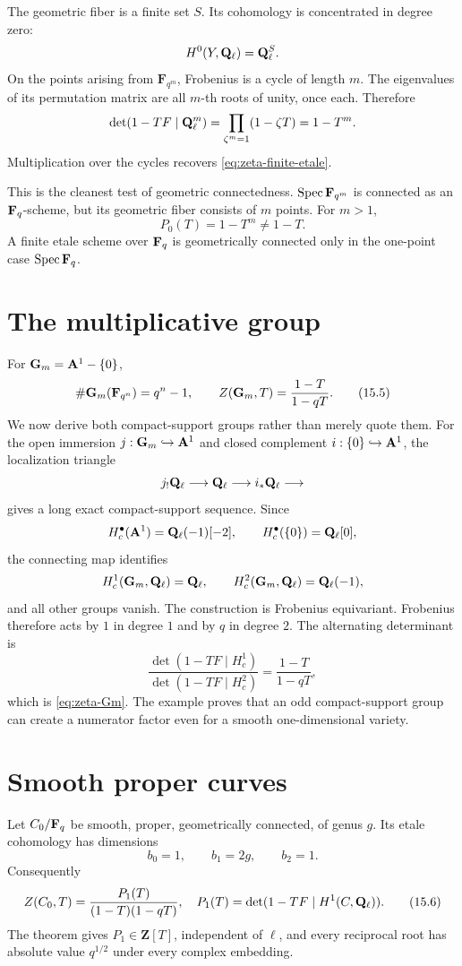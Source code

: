 The geometric fiber is a finite set \(S\).  Its cohomology is concentrated
in degree zero:
\[
 H^0(Y,\mathbf Q_\ell)=\mathbf Q_\ell^S.
\]
On the points arising from \(\mathbf F_{q^m}\), Frobenius is a cycle of
length \(m\).  The eigenvalues of its permutation matrix are all
\(m\)-th roots of unity, once each.  Therefore
\[
 \det(1-TF\mid\mathbf Q_\ell^{m})
 =\prod_{\zeta^m=1}(1-\zeta T)=1-T^m.
\]
Multiplication over the cycles recovers
\eqref{eq:zeta-finite-etale}.

This is the cleanest test of geometric connectedness.
\(\operatorname{Spec}\mathbf F_{q^m}\) is connected as an \(\mathbf F_q\)-scheme, but its
geometric fiber consists of \(m\) points.  For \(m>1\),
\[
 P_0(T)=1-T^m\neq1-T.
\]
A finite etale scheme over \(\mathbf F_q\) is geometrically connected only in
the one-point case \(\operatorname{Spec}\mathbf F_q\).

\section{The multiplicative group}

For \(\mathbf G_m=\mathbf A^1-\{0\}\),
\[
 \#\mathbf G_m(\mathbf F_{q^n})=q^n-1,
\qquad
 Z(\mathbf G_m,T)=\frac{1-T}{1-qT}.
 \tag{15.5}\label{eq:zeta-Gm}
\]
We now derive both compact-support groups rather than merely quote them.
For the open immersion \(j:\mathbf G_m\hookrightarrow\mathbf A^1\) and closed
complement \(i:\{0\}\hookrightarrow\mathbf A^1\), the localization triangle
\[
 j_!\mathbf Q_\ell\longrightarrow\mathbf Q_\ell\longrightarrow i_*\mathbf Q_\ell\longrightarrow
\]
gives a long exact compact-support sequence.  Since
\[
 H_c^\bullet(\mathbf A^1)=\mathbf Q_\ell(-1)[-2],
\qquad
 H_c^\bullet(\{0\})=\mathbf Q_\ell[0],
\]
the connecting map identifies
\[
 H_c^1(\mathbf G_m,\mathbf Q_\ell)=\mathbf Q_\ell,
\qquad
 H_c^2(\mathbf G_m,\mathbf Q_\ell)=\mathbf Q_\ell(-1),
\]
and all other groups vanish.  The construction is Frobenius equivariant.
Frobenius therefore acts by \(1\) in degree \(1\) and by \(q\) in degree
\(2\).  The alternating determinant is
\[
 \frac{\det(1-TF\mid H_c^1)}
      {\det(1-TF\mid H_c^2)}
 =\frac{1-T}{1-qT},
\]
which is \eqref{eq:zeta-Gm}.  The example proves that an odd
compact-support group can create a numerator factor even for a smooth
one-dimensional variety.

\section{Smooth proper curves}

Let \(C_0/\mathbf F_q\) be smooth, proper, geometrically connected, of genus
\(g\).  Its etale cohomology has dimensions
\[
 b_0=1,\qquad b_1=2g,\qquad b_2=1.
\]
Consequently
\[
 Z(C_0,T)=\frac{P_1(T)}{(1-T)(1-qT)},
\quad
 P_1(T)=\det(1-TF\mid H^1(C,\mathbf Q_\ell)).
 \tag{15.6}\label{eq:zeta-curve}
\]
The theorem gives \(P_1\in\mathbf Z[T]\), independent of \(\ell\), and
every reciprocal root has absolute value \(q^{1/2}\) under every complex
embedding.

